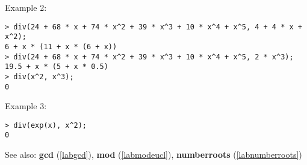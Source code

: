 \noindent Example 2: 
\begin{center}\begin{minipage}{15cm}\begin{Verbatim}[frame=single]
> div(24 + 68 * x + 74 * x^2 + 39 * x^3 + 10 * x^4 + x^5, 4 + 4 * x + x^2);
6 + x * (11 + x * (6 + x))
> div(24 + 68 * x + 74 * x^2 + 39 * x^3 + 10 * x^4 + x^5, 2 * x^3);
19.5 + x * (5 + x * 0.5)
> div(x^2, x^3);
0
\end{Verbatim}
\end{minipage}\end{center}
\noindent Example 3: 
\begin{center}\begin{minipage}{15cm}\begin{Verbatim}[frame=single]
> div(exp(x), x^2);
0
\end{Verbatim}
\end{minipage}\end{center}
See also: \textbf{gcd} (\ref{labgcd}), \textbf{mod} (\ref{labmodeucl}), \textbf{numberroots} (\ref{labnumberroots})
